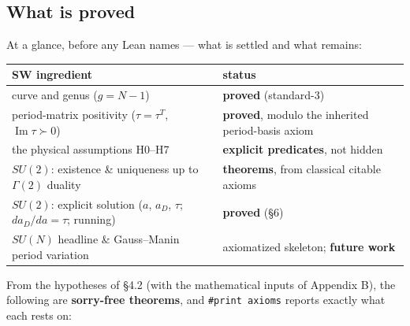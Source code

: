 \documentclass{article}
\theoremstyle{plain}
\theoremstyle{definition}
\numberwithin{equation}{section}
\newcommand{\Imag}{\operatorname{Im}}
\newcommand{\code}[1]{\texttt{#1}}
\begin{document}
\subsection{What is proved}

At a glance, before any Lean names --- what is settled and what remains:

\begin{center}\small
\begin{tabular}{ll}
\hline
SW ingredient & status\\
\hline
curve and genus ($g=N-1$) & \textbf{proved} (standard-3)\\
period-matrix positivity ($\tau=\tau^{T}$, $\Imag\tau\succ0$) & \textbf{proved}, modulo the inherited period-basis axiom\\
the physical assumptions H0--H7 & \textbf{explicit predicates}, not hidden\\
$SU(2)$: existence \& uniqueness up to $\Gamma(2)$ duality & \textbf{theorems}, from classical citable axioms\\
$SU(2)$: explicit solution ($a$, $a_D$, $\tau$; $da_D/da=\tau$; running) & \textbf{proved} (\S6)\\
$SU(N)$ headline \& Gauss--Manin period variation & axiomatized skeleton; \textbf{future work}\\
\hline
\end{tabular}
\end{center}

From the hypotheses of \S4.2 (with the mathematical inputs of Appendix B), the following are
\textbf{sorry-free theorems}, and \code{\#print axioms} reports exactly what each rests on:
\end{document}
